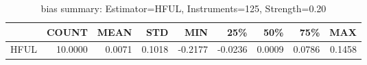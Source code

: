 \begin{table}[ht]
\centering
\caption{bias summary: Estimator=HFUL, Instruments=125, Strength=0.20}
\begin{tabular}{lrrrrrrrr}
\toprule
 & COUNT & MEAN & STD & MIN & 25\% & 50\% & 75\% & MAX \\
\midrule
HFUL & 10.0000 & 0.0071 & 0.1018 & -0.2177 & -0.0236 & 0.0009 & 0.0786 & 0.1458 \\
\bottomrule
\end{tabular}
\end{table}
